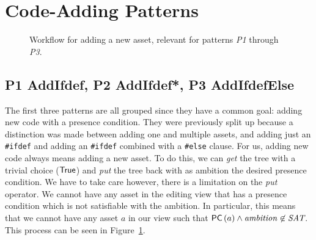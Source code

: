\section{Code-Adding Patterns}
\begin{figure}
  \centering
  \caption{Workflow for adding a new asset, relevant for patterns \emph{P1} through \emph{P3}.}
  \label{fig:patterns:p1}
\end{figure}
\subsection*{P1 AddIfdef, P2 AddIfdef*, P3 AddIfdefElse}
The first three patterns are all grouped since they have a common goal:
adding new code with a presence condition. They were previously split up because
a distinction was made between adding one and multiple assets, and adding just an
\texttt{\#ifdef} and adding an \texttt{\#ifdef} combined with a \texttt{\#else} clause.
For us, adding new code always means adding a new asset. To do this, we can \emph{get}
the tree with a trivial choice (\({\sf True}\)) and \emph{put} the tree back with as
ambition the desired presence condition. We have to take care however, there is a limitation
on the \emph{put} operator. We cannot have any asset in the editing view that
has a presence condition which is not satisfiable with the ambition. In
particular, this means that we cannot have any asset $a$ in our view such that
\({\sf PC}\left(a\right) \land \mathit{ambition} \not\in \textit{SAT}\).
This process can be seen in Figure~\ref{fig:patterns:p1}.

